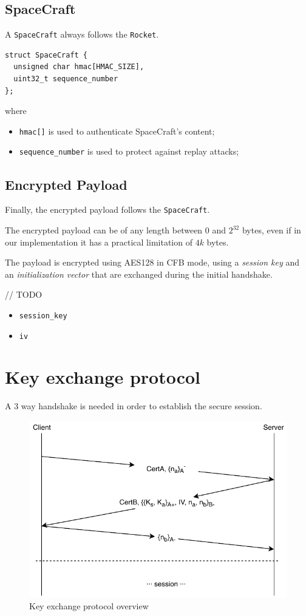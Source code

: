 \documentclass[a4paper,12pt]{article}
\begin{document}
\subsection{SpaceCraft}
A \texttt{SpaceCraft} always follows the \texttt{Rocket}.

\begin{verbatim}
struct SpaceCraft {
  unsigned char hmac[HMAC_SIZE],
  uint32_t sequence_number
};
\end{verbatim}

where

\begin{itemize}
  \item \texttt{hmac[]} is used to authenticate SpaceCraft's content;
  \item \texttt{sequence\_number} is used to protect against replay attacks;
\end{itemize}

\subsection{Encrypted Payload}
Finally, the encrypted payload follows the \texttt{SpaceCraft}.

The encrypted payload can be of any length between $0$ and $2^{32}$ bytes, even if in our implementation it has a practical limitation of $4k$ bytes.

The payload is encrypted using AES128 in CFB mode, using a \emph{session key} and an \emph{initialization vector} that are exchanged during the initial handshake.

// TODO

\begin{itemize}
  \item \texttt{session_key}
  \item \texttt{iv}
\end{itemize}

\section{Key exchange protocol}
A 3 way handshake is needed in order to establish the secure session.

\begin{figure}[H]
\centering
\includegraphics{img/key-exchange-protocol.pdf}
\caption{Key exchange protocol overview}
\end{figure}
\end{document}
